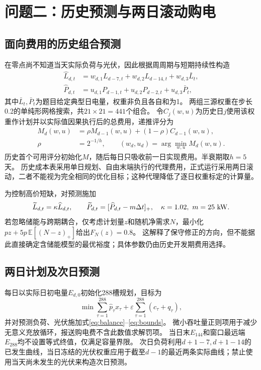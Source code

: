 \section{问题二：历史预测与两日滚动购电}
\subsection{面向费用的历史组合预测}
在零点尚不知道当天实际负荷与光伏，因此根据周周期与短期持续性构造
\begin{align}
\widehat L_{d,t}&=w_{d,1}L_{d-7,t}+w_{d,2}L_{d-14,t}+w_{d,3}\bar L_t,\label{eq:load}\\
\widehat P_{d,t}&=u_{d,1}P_{d-1,t}+u_{d,2}P_{d-2,t}+u_{d,3}\bar P_t,\label{eq:pv}
\end{align}
其中$\bar L_t,\bar P_t$为题目给定典型日电量，权重非负且各自和为1。
两组三源权重在步长0.2的单纯形网格搜索，共$21\times21=441$个组合。
令$C_j(w,u)$为历史日$j$使用该权重作计划并以实际值因果执行后的总费用，递推评分为
\begin{equation}
\begin{aligned}
M_d(w,u)&=\rho M_{d-1}(w,u)+(1-\rho)C_{d-1}(w,u),\\
\rho&=2^{-1/h},\qquad (w_d,u_d)=\arg\min_{w,u}M_d(w,u).
\end{aligned}
\label{eq:ewma}
\end{equation}
历史首个可用评分初始化$M$，随后每日只吸收前一日实现费用。半衰期取$h=5$天。
历史成本表采用单日规划、自由末端执行的代理费用，正式运行采用两日滚动，二者不能视为完全相同的优化目标；这种代理降低了逐日权重标定的计算量。

为控制高价短缺，对预测施加
\begin{equation}
\widetilde L_{d,t}=\kappa\widehat L_{d,t},\qquad
\widetilde P_{d,t}=[\widehat P_{d,t}-m\Delta t]_+,
\quad \kappa=1.02,\ m=25\ {\rm kW}.
\label{eq:margin}
\end{equation}
若忽略储能与跨期耦合，仅考虑计划量$z$和随机净需求$N$，最小化
$pz+5p\,\mathbb E[(N-z)_+]$给出$F_N(z)=0.8$。
这解释了保守修正的方向，但不能据此直接确定含储能模型的最优裕度；具体参数仍由历史开发期费用选择。
\subsection{两日计划及次日预测}
每日以实际日初电量$E_{d,0}$初始化288槽规划，目标为
\begin{equation}
\min\sum_{\tau=1}^{288}\widehat p_\tau x_\tau+
\varepsilon\sum_{\tau=1}^{288}(c_\tau+q_\tau),
\label{eq:rolling}
\end{equation}
并对预测负荷、光伏施加式\eqref{eq:balance}--\eqref{eq:bounds}。
微小吞吐量正则项用于减少无意义充放循环，报送购电费不含此数值求解罚项。
当日末$E_{144}$和窗口最远端$E_{288}$均不设置等式终值，仅满足容量界限。
次日负荷利用$d+1-7,d+1-14$的已发生曲线，当日冻结的光伏权重应用于截至$d-1$的最近两条实际曲线；禁止使用当天尚未发生的光伏来构造次日预测。
